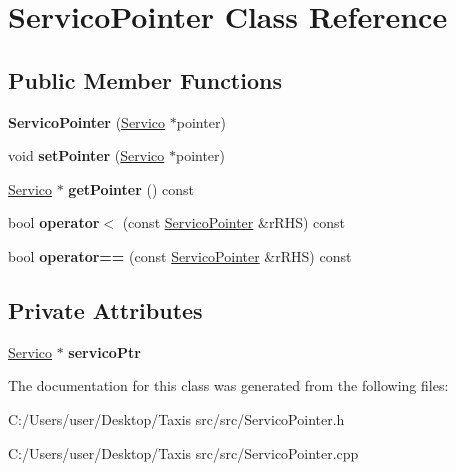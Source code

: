 \hypertarget{class_servico_pointer}{}\section{Servico\+Pointer Class Reference}
\label{class_servico_pointer}
\subsection*{Public Member Functions}
\begin{DoxyCompactItemize}
\item 
\mbox{\label{class_servico_pointer_ae5e820f636acd0906661e07564251650}} 
{\bfseries Servico\+Pointer} (\hyperlink{class_servico}{Servico} $\ast$pointer)
\item 
\mbox{\label{class_servico_pointer_aea86200a1198a868456e2afc8f9dd75d}} 
void {\bfseries set\+Pointer} (\hyperlink{class_servico}{Servico} $\ast$pointer)
\item 
\mbox{\label{class_servico_pointer_ad96e4e2dad8e3101c56d993a44e87f8c}} 
\hyperlink{class_servico}{Servico} $\ast$ {\bfseries get\+Pointer} () const
\item 
\mbox{\label{class_servico_pointer_a6525440bcdc1b759fc799a32eacb3b92}} 
bool {\bfseries operator$<$} (const \hyperlink{class_servico_pointer}{Servico\+Pointer} \&r\+R\+HS) const
\item 
\mbox{\label{class_servico_pointer_a14cc6f5cc0b144fa2c00216a7566bbe8}} 
bool {\bfseries operator==} (const \hyperlink{class_servico_pointer}{Servico\+Pointer} \&r\+R\+HS) const
\end{DoxyCompactItemize}
\subsection*{Private Attributes}
\begin{DoxyCompactItemize}
\item 
\mbox{\label{class_servico_pointer_af015489d63acb562fa55b702ab85dd42}} 
\hyperlink{class_servico}{Servico} $\ast$ {\bfseries servico\+Ptr}
\end{DoxyCompactItemize}


The documentation for this class was generated from the following files\+:\begin{DoxyCompactItemize}
\item 
C\+:/\+Users/user/\+Desktop/\+Taxis src/src/Servico\+Pointer.\+h\item 
C\+:/\+Users/user/\+Desktop/\+Taxis src/src/Servico\+Pointer.\+cpp\end{DoxyCompactItemize}
